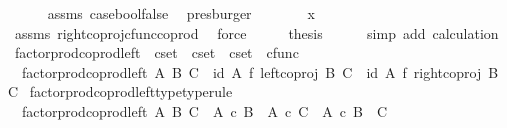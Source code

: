 \begin{isabellebody}
\ \ \ \ \isamarkupfalse%
\ assms\ case{\isacharunderscore}{\kern0pt}bool{\isacharunderscore}{\kern0pt}false\ \isamarkupfalse%
\ presburger\isanewline
\ \ \isamarkupfalse%
\ \isamarkupfalse%
\ {\isachardoublequoteopen}{\isachardot}{\kern0pt}{\isachardot}{\kern0pt}{\isachardot}{\kern0pt}\ {\isacharequal}{\kern0pt}\ x{}{\isachardoublequoteclose}\isanewline
\ \ \ \ \isamarkupfalse%
\ assms\ right{\isacharunderscore}{\kern0pt}coproj{\isacharunderscore}{\kern0pt}cfunc{\isacharunderscore}{\kern0pt}coprod\ \isamarkupfalse%
\ force\isanewline
\ \ \isamarkupfalse%
\ \isamarkupfalse%
\ {\isacharquery}{\kern0pt}thesis\isanewline
\ \ \ \ \isamarkupfalse%
\ {\isacharparenleft}{\kern0pt}simp\ add{\isacharcolon}{\kern0pt}\ calculation{\isacharparenright}{\kern0pt}\isanewline
{}\isamarkupfalse%
%
\endisatagproof
{\isafoldproof}%
%
\isadelimproof
%
\endisadelimproof
%
\isadelimdocument
%
\endisadelimdocument
%
\isatagdocument
%
\isamarkuptrue%
%
\isamarkuptrue%
%
\endisatagdocument
{\isafolddocument}%
%
\isadelimdocument
%
\endisadelimdocument
{}\isamarkupfalse%
\ factor{\isacharunderscore}{\kern0pt}prod{\isacharunderscore}{\kern0pt}coprod{\isacharunderscore}{\kern0pt}left\ {\isacharcolon}{\kern0pt}{\isacharcolon}{\kern0pt}\ {\isachardoublequoteopen}cset\ {\isasymRightarrow}\ cset\ {\isasymRightarrow}\ cset\ {\isasymRightarrow}\ cfunc{\isachardoublequoteclose}\ \isanewline
\ \ {\isachardoublequoteopen}factor{\isacharunderscore}{\kern0pt}prod{\isacharunderscore}{\kern0pt}coprod{\isacharunderscore}{\kern0pt}left\ A\ B\ C\ {\isacharequal}{\kern0pt}\ {\isacharparenleft}{\kern0pt}id\ A\ {\isasymtimes}\isactrlsub f\ left{\isacharunderscore}{\kern0pt}coproj\ B\ C{\isacharparenright}{\kern0pt}\ {\isasymamalg}\ {\isacharparenleft}{\kern0pt}id\ A\ {\isasymtimes}\isactrlsub f\ right{\isacharunderscore}{\kern0pt}coproj\ B\ C{\isacharparenright}{\kern0pt}{\isachardoublequoteclose}\isanewline
\isanewline
{}\isamarkupfalse%
\ factor{\isacharunderscore}{\kern0pt}prod{\isacharunderscore}{\kern0pt}coprod{\isacharunderscore}{\kern0pt}left{\isacharunderscore}{\kern0pt}type{\isacharbrackleft}{\kern0pt}type{\isacharunderscore}{\kern0pt}rule{\isacharbrackright}{\kern0pt}{\isacharcolon}{\kern0pt}\isanewline
\ \ {\isachardoublequoteopen}factor{\isacharunderscore}{\kern0pt}prod{\isacharunderscore}{\kern0pt}coprod{\isacharunderscore}{\kern0pt}left\ A\ B\ C\ {\isacharcolon}{\kern0pt}\ {\isacharparenleft}{\kern0pt}A\ {\isasymtimes}\isactrlsub c\ B{\isacharparenright}{\kern0pt}\ {\isasymCoprod}\ {\isacharparenleft}{\kern0pt}A\ {\isasymtimes}\isactrlsub c\ C{\isacharparenright}{\kern0pt}\ {\isasymrightarrow}\ A\ {\isasymtimes}\isactrlsub c\ {\isacharparenleft}{\kern0pt}B\ {\isasymCoprod}\ C{\isacharparenright}{\kern0pt}{\isachardoublequoteclose}\isanewline

\end{isabellebody}
